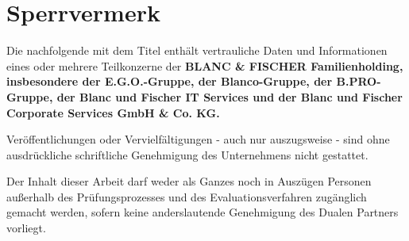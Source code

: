 
\thispagestyle{empty}
\section*{Sperrvermerk}

\vspace*{2em}

Die nachfolgende {\arbeitsart} mit dem Titel {\itshape \titel} enthält vertrauliche Daten und Informationen eines oder mehrere Teilkonzerne der \textbf{BLANC \& FISCHER Familienholding, insbesondere der E.G.O.-Gruppe, der Blanco-Gruppe, der B.PRO-Gruppe, der Blanc und Fischer IT Services und der Blanc und Fischer Corporate Services GmbH \& Co. KG.}

Veröffentlichungen oder Vervielfältigungen - auch nur auszugsweise - sind ohne ausdrückliche schriftliche Genehmigung des Unternehmens nicht gestattet.

Der Inhalt dieser Arbeit darf weder als Ganzes noch in Auszügen Personen außerhalb des Prüfungsprozesses und des Evaluationsverfahren zugänglich gemacht werden, sofern keine anderslautende Genehmigung des Dualen Partners vorliegt.
